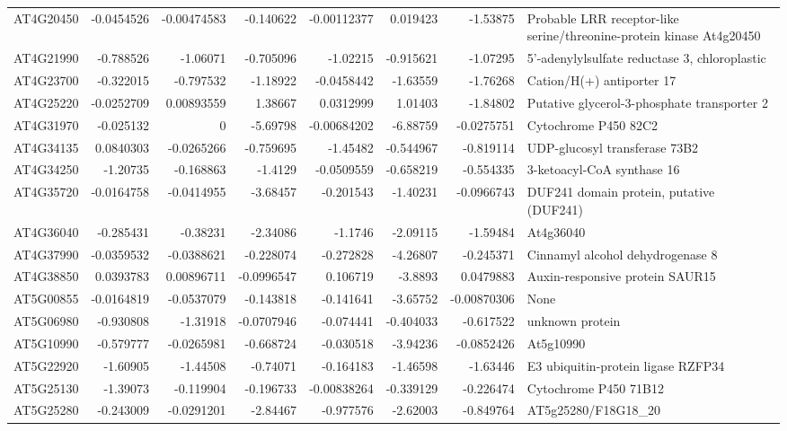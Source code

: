 \documentclass[11pt]{article}
\begin{document}
\begin{center}
\begin{tabular}{lrrrrrrl}
AT4G20450 & -0.0454526 & -0.00474583 & -0.140622 & -0.00112377 & 0.019423 & -1.53875 & Probable LRR receptor-like serine/threonine-protein kinase At4g20450\\
AT4G21990 & -0.788526 & -1.06071 & -0.705096 & -1.02215 & -0.915621 & -1.07295 & 5'-adenylylsulfate reductase 3, chloroplastic\\
AT4G23700 & -0.322015 & -0.797532 & -1.18922 & -0.0458442 & -1.63559 & -1.76268 & Cation/H(+) antiporter 17\\
AT4G25220 & -0.0252709 & 0.00893559 & 1.38667 & 0.0312999 & 1.01403 & -1.84802 & Putative glycerol-3-phosphate transporter 2\\
AT4G31970 & -0.025132 & 0 & -5.69798 & -0.00684202 & -6.88759 & -0.0275751 & Cytochrome P450 82C2\\
AT4G34135 & 0.0840303 & -0.0265266 & -0.759695 & -1.45482 & -0.544967 & -0.819114 & UDP-glucosyl transferase 73B2\\
AT4G34250 & -1.20735 & -0.168863 & -1.4129 & -0.0509559 & -0.658219 & -0.554335 & 3-ketoacyl-CoA synthase 16\\
AT4G35720 & -0.0164758 & -0.0414955 & -3.68457 & -0.201543 & -1.40231 & -0.0966743 & DUF241 domain protein, putative (DUF241)\\
AT4G36040 & -0.285431 & -0.38231 & -2.34086 & -1.1746 & -2.09115 & -1.59484 & At4g36040\\
AT4G37990 & -0.0359532 & -0.0388621 & -0.228074 & -0.272828 & -4.26807 & -0.245371 & Cinnamyl alcohol dehydrogenase 8\\
AT4G38850 & 0.0393783 & 0.00896711 & -0.0996547 & 0.106719 & -3.8893 & 0.0479883 & Auxin-responsive protein SAUR15\\
AT5G00855 & -0.0164819 & -0.0537079 & -0.143818 & -0.141641 & -3.65752 & -0.00870306 & None\\
AT5G06980 & -0.930808 & -1.31918 & -0.0707946 & -0.074441 & -0.404033 & -0.617522 & unknown protein\\
AT5G10990 & -0.579777 & -0.0265981 & -0.668724 & -0.030518 & -3.94236 & -0.0852426 & At5g10990\\
AT5G22920 & -1.60905 & -1.44508 & -0.74071 & -0.164183 & -1.46598 & -1.63446 & E3 ubiquitin-protein ligase RZFP34\\
AT5G25130 & -1.39073 & -0.119904 & -0.196733 & -0.00838264 & -0.339129 & -0.226474 & Cytochrome P450 71B12\\
AT5G25280 & -0.243009 & -0.0291201 & -2.84467 & -0.977576 & -2.62003 & -0.849764 & AT5g25280/F18G18\_20\\

\end{tabular}
\end{center}
\end{document}
